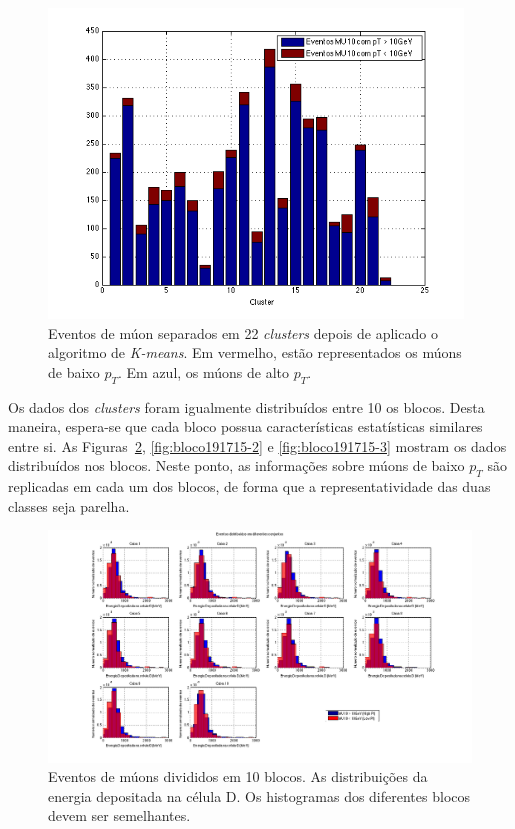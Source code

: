 \begin{figure}[htpb!]
    \centering
    \includegraphics[width=11cm]{images/sglmuon/distribuicao_clusters.png}
    \caption{Eventos de múon separados em 22 \emph{clusters} depois de aplicado
    o algoritmo de \emph{K-means}. Em vermelho, estão representados os múons de
    baixo $p_T$. Em azul, os múons de alto $p_T$.}
    \label{fig:clusters191715}
\end{figure}

Os dados dos \emph{clusters} foram igualmente distribuídos entre 10 os blocos.
Desta maneira, espera-se que cada bloco possua características estatísticas
similares entre si.  As Figuras~\ref{fig:bloco191715-1}, \ref{fig:bloco191715-2} e
\ref{fig:bloco191715-3} mostram os dados distribuídos nos blocos. Neste ponto,
as informações sobre múons de baixo $p_T$ são replicadas em cada um dos blocos,
de forma que a representatividade das duas classes seja parelha.


\begin{figure}
    \centering
    \includegraphics[width=\textheight]{images/sglmuon/eventos_caixas.png}
    \caption{Eventos de múons divididos em 10 blocos. As distribuições da
    energia depositada na célula D. Os histogramas dos diferentes blocos devem
    ser semelhantes.}
    \label{fig:bloco191715-1}
\end{figure}

